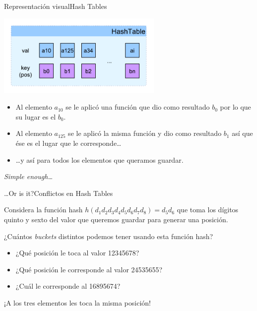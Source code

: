 \documentclass[spanish, c]{beamer}
\begin{document}
\begin{frame}{Representación visual}{Hash Tables}
    
    \begin{center}
        \includegraphics[width=0.6\textwidth]{hash-struct.pdf}
    \end{center}

    \begin{itemize}
        \item Al elemento ${a_{10}}$ se le aplicó una función que dio como resultado $b_0$ por lo que su lugar es el $b_0$.
        \item Al elemento ${a_{125}}$ se le aplicó la misma función y dio como resultado $b_1$ así que ése es el lugar que le corresponde\dots
        \item \dots y así para todos los elementos que queramos guardar.
    \end{itemize}

    \textit{Simple enough\dots}
\end{frame}

\begin{frame}{\dots Or is it?}{Conflictos en Hash Tables}

    Considera la función hash $h(d_1 d_2 d_3 d_4 d_5 d_6 d_7 d_8) = d_5 d_6$ que toma los dígitos quinto y sexto del valor que queremos guardar para generar una posición.

    \bigskip
    
    ¿Cuántos \textit{buckets} distintos podemos tener usando esta función hash? \pause

    \bigskip

    \begin{itemize}
        \item ¿Qué posición le toca al valor 12345678? \pause
        \item ¿Qué posición le corresponde al valor 24535655? \pause
        \item ¿Cuál le corresponde al 16895674? \pause
    \end{itemize}

    \bigskip
    
    ¡A los tres elementos les toca la misma posición!
\end{frame}
\end{document}
